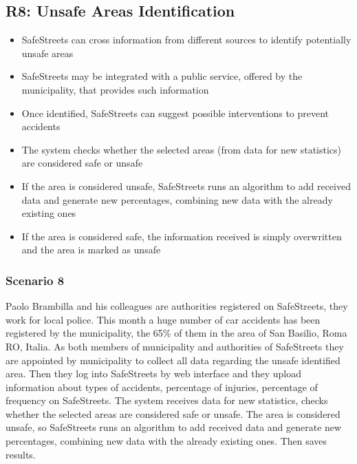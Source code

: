 \subsection{R8: Unsafe Areas Identification}
\begin{itemize}
  \item SafeStreets can cross information from different sources to identify potentially unsafe areas
  \item SafeStreets may be integrated with a public service, offered by the municipality, that provides such information
  \item Once identified, SafeStreets can suggest possible interventions to prevent accidents
  \item The system checks whether the selected areas (from data for new statistics) are considered safe or unsafe 
  \item If the area is considered unsafe, SafeStreets runs an algorithm to add received data and generate new percentages, combining new data with the already existing ones
  \item If the area is considered safe, the information received is simply overwritten and the area is marked as unsafe
\end{itemize}
\subsubsection{Scenario 8}
Paolo Brambilla and his colleagues are authorities registered on SafeStreets, they work for local police. This month a huge number of car accidents has been registered by the municipality, the 65\% of them in the area of San Basilio, Roma RO, Italia. As both members of municipality and authorities of SafeStreets they are appointed by municipality to collect all data regarding the unsafe identified area. Then they log into SafeStreets by web interface and they upload information about types of accidents, percentage of injuries, percentage of frequency on SafeStreets. The system receives data for new statistics, checks whether the selected areas are considered safe or unsafe. The area is considered unsafe, so SafeStreets runs an algorithm to add received data and generate new percentages, combining new data with the already existing ones. Then saves results.
